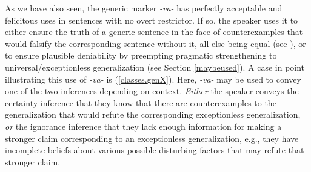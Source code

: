 \documentclass[output=paper,colorlinks,citecolor=brown]{langscibook}
\begin{document}
As we have also seen, the generic marker \textit{-va-} has perfectly acceptable and felicitous uses in sentences with no overt restrictor.
If so, the speaker uses it to either
ensure the truth of a generic sentence
in the face of counterexamples that would falsify the corresponding sentence without it, all else being equal (see ), or
to ensure plausible
deniability by preempting pragmatic strengthening to  universal/exceptionless generalization (see Section \ref{maybeused}).
A case in point illustrating this use of \textit{-va-} is (\ref{classes.genX}). Here, \textit{-va-} may be used to convey one of the two inferences depending on context.  \textit{Either} the speaker conveys the certainty inference that they know that there are counterexamples to the generalization that would refute the corresponding exceptionless generalization, \textit{or} the ignorance inference that they lack enough information for making a stronger claim corresponding to an exceptionless  generalization, e.g., they have incomplete beliefs about various possible disturbing factors that may refute that stronger claim.
\end{document}
